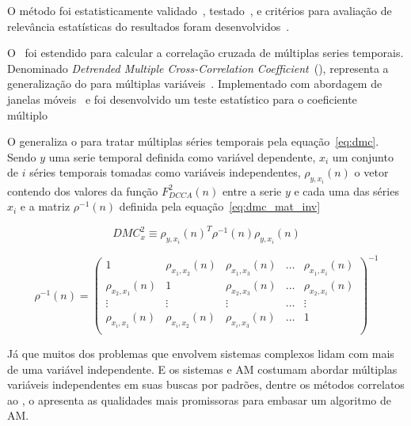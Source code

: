 O método foi estatisticamente validado~\cite{PhysRevE.84.066118}, testado~\cite{vassolerZebende2012, Guedes2017, Ferreira2018},
e critérios para avaliação de relevância estatísticas do resultados foram desenvolvidos~\cite{Guedes2018,Guedes2018a}.

O \pdcca~foi estendido para calcular a correlação cruzada de múltiplas series temporais. Denominado \emph{Detrended Multiple Cross-Correlation Coefficient}~(\dmc), representa a generalização do \pdcca para múltiplas variáveis~\cite{Zebende2018}. Implementado com abordagem de janelas móveis~\cite{Guedes2021} e foi desenvolvido um teste estatístico para o coeficiente múltiplo~\cite{DaSilvaFilho2021}

O \dmc generaliza o \pdcca para tratar múltiplas séries temporais pela equação~\ref{eq:dmc}. Sendo $y$ uma serie temporal definida como variável dependente, $x_{i}$ um conjunto de $i$ séries temporais tomadas como variáveis independentes,  $\rho_{y,x_{i}}(n)$ o vetor contendo dos valores da função $F_{DCCA}^{2}(n)$ entre a serie $y$ e cada uma das séries $x_{i}$ e a matriz  $\rho^{-1}(n)$ definida pela equação~\ref{eq:dmc_mat_inv}

\begin{equation}\label{eq:dmc}
  {DMC}_{x}^{2}  \equiv \rho_{y,x_{i}}(n)^{T} \rho^{-1}(n) \rho_{y,x_{i}}(n)
\end{equation}


\begin{equation}\label{eq:dmc_mat_inv}
  \rho^{-1}(n) = \left(\begin{matrix} 
    1 & \rho_{x_{1},x_{2}}(n)                       &  \rho_{x_{1},x_{3}}(n) & \dots  &  \rho_{x_{1},x_{i}}(n) \\
    \rho_{x_{2},x_{1}}(n) & 1                       &  \rho_{x_{2},x_{3}}(n) & \dots  &  \rho_{x_{2},x_{i}}(n) \\
    \vdots                &  \vdots                 &  \vdots                & \dots  & \vdots \\
    \rho_{x_{i},x_{1}}(n) & \rho_{x_{i},x_{2}}(n)   &  \rho_{x_{i},x_{3}}(n) & \dots  &  1 \\
    \end{matrix}\right)^{-1}
\end{equation}

Já que muitos dos problemas que envolvem sistemas complexos lidam com mais de uma variável independente. E os sistemas e AM costumam abordar múltiplas variáveis independentes em suas buscas por padrões, dentre os métodos correlatos ao \pdcca, o \dmc apresenta as qualidades mais promissoras para embasar um algoritmo de AM.



